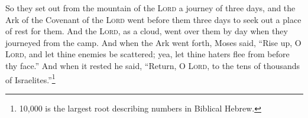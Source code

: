 \begin{enumerate*}[mode=unboxed]
     So they set out from the mountain of the \textsc{Lord} a journey of three days, and the Ark of the Covenant of the \textsc{Lord} went before them three days to seek out a place of rest for them.%
     And the \textsc{Lord}, as a cloud, went over them by day when they journeyed from the camp.%
     And when the Ark went forth, Moses said, ``Rise up, O \textsc{Lord}, and let thine enemies be scattered; yea, let thine haters flee from before thy face.''%
     And when it rested he said, ``Return, O \textsc{Lord}, to the tens of thousands of Israelites.''\footnote{10,000 is the largest root describing numbers in Biblical Hebrew.}%
\end{enumerate*}

